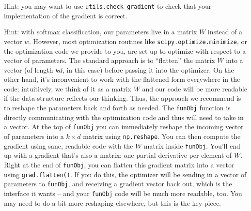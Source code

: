 \documentclass{article}
\begin{document}
Hint: you may want to use \verb|utils.check_gradient| to check that your implementation of the gradient is correct.

Hint: with softmax classification, our parameters live in a matrix $W$ instead of a vector $w$. However, most optimization routines like \texttt{scipy.optimize.minimize}, or the optimization code we provide to you, are set up to optimize with respect to a vector of parameters. The standard approach is to ``flatten'' the matrix $W$ into a vector (of length $kd$, in this case) before passing it into the optimizer. On the other hand, it's inconvenient to work with the flattened form everywhere in the code; intuitively, we think of it as a matrix $W$ and our code will be more readable if the data structure reflects our thinking. Thus, the approach we recommend is to reshape the parameters back and forth as needed. The \texttt{funObj} function is directly communicating with the optimization code and thus will need to take in a vector. At the top of \texttt{funObj} you can immediately reshape the incoming vector of parameters into a $k \times d$ matrix using \texttt{np.reshape}. You can then compute the gradient using sane, readable code with the $W$ matrix inside \texttt{funObj}. You'll end up with a gradient that's also a matrix: one partial derivative per element of $W$. Right at the end of \texttt{funObj}, you can flatten this gradient matrix into a vector using \texttt{grad.flatten()}. If you do this, the optimizer will be sending in a vector of parameters to \texttt{funObj}, and receiving a gradient vector back out, which is the interface it wants -- and your \texttt{funObj} code will be much more readable, too. You may need to do a bit more reshaping elsewhere, but this is the key piece.
\end{document}
